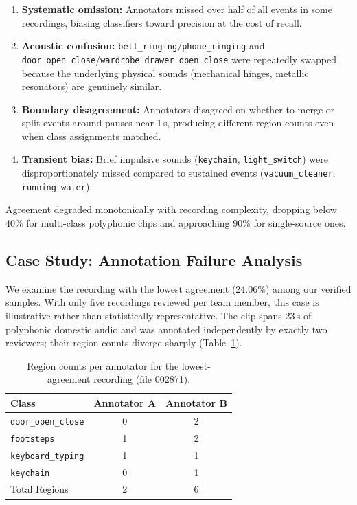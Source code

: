 \documentclass{article}
\begin{document}
\begin{enumerate}
\item \textbf{Systematic omission:} Annotators missed over half of all events in some recordings, biasing classifiers toward precision at the cost of recall.
\item \textbf{Acoustic confusion:} \texttt{bell\_ringing}/\texttt{phone\_ringing} and \texttt{door\_open\_close}/\texttt{wardrobe\_drawer\_open\_close} were repeatedly swapped because the underlying physical sounds (mechanical hinges, metallic resonators) are genuinely similar.
\item \textbf{Boundary disagreement:} Annotators disagreed on whether to merge or split events around pauses near 1\,s, producing different region counts even when class assignments matched.
\item \textbf{Transient bias:} Brief impulsive sounds (\texttt{keychain}, \texttt{light\_switch}) were disproportionately missed compared to sustained events (\texttt{vacuum\_cleaner}, \texttt{running\_water}).
\end{enumerate}

Agreement degraded monotonically with recording complexity, dropping below 40\% for multi-class polyphonic clips and approaching 90\% for single-source ones.

\subsection{Case Study: Annotation Failure Analysis}

We examine the recording with the lowest agreement (24.06\%) among our verified samples. With only five recordings reviewed per team member, this case is illustrative rather than statistically representative. The clip spans 23\,s of polyphonic domestic audio and was annotated independently by exactly two reviewers; their region counts diverge sharply (Table~\ref{tab:case_study}).

\begin{table}[t]
  \centering
  \small
  \caption{Region counts per annotator for the lowest-agreement recording (file 002871).}
  \label{tab:case_study}
  \begin{tabular}{lcc}
    \toprule
    Class & Annotator A & Annotator B \\
    \midrule
    \texttt{door\_open\_close} & 0 & 2 \\
    \texttt{footsteps} & 1 & 2 \\
    \texttt{keyboard\_typing} & 1 & 1 \\
    \texttt{keychain} & 0 & 1 \\
    \midrule
    Total Regions & 2 & 6 \\
    \bottomrule
  \end{tabular}
\end{table}
\end{document}
